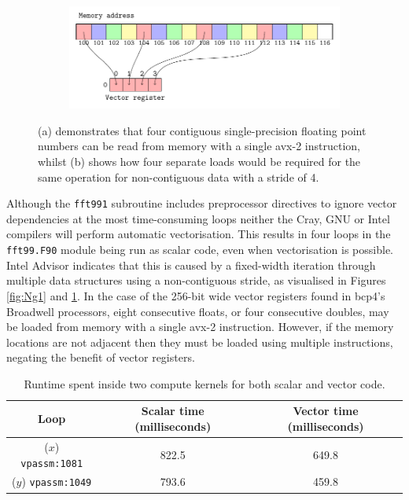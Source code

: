 \documentclass[a4paper,11pt]{report}
\begin{document}
\begin{figure}[htbp]\ContinuedFloat

\begin{subfigure}[b]{1\textwidth}
\centering
   \includegraphics[width=0.80\linewidth]{img/tikz-img/vector_registers_noncontiguous/vector_registers.pdf}
   \caption{}
   \label{fig:Ng2}
\end{subfigure}

\caption[Contiguous and non-contiguous memory access]{ (a) demonstrates that four contiguous single-precision floating point numbers can be read from memory with a single \gls{avx}-2 instruction, whilst (b) shows how four separate loads would be required for the same operation for non-contiguous data with a stride of 4.}
\label{fig:vector-registers} 
\end{figure}
\par
Although the \texttt{fft991} subroutine includes preprocessor directives to ignore vector dependencies at the most time-consuming loops neither the Cray, GNU or Intel compilers will perform automatic vectorisation. This results in four loops in the \texttt{fft99.F90} module being run as scalar code, even when vectorisation is possible. Intel Advisor indicates that this is caused by a fixed-width iteration through multiple data structures using a non-contiguous stride, as visualised in Figures \ref{fig:Ng1} and \ref{fig:Ng2}. In the case of the 256-bit wide vector registers found in \gls{bcp4}'s Broadwell processors, eight consecutive floats, or four consecutive doubles, may be loaded from memory with a single \gls{avx}-2 instruction. However, if the memory locations are not adjacent then they must be loaded using multiple instructions, negating the benefit of vector registers. 
\par
\begin{table}[htp]
\caption{Runtime spent inside two compute kernels for both scalar and vector code.}
\begin{center}
\begin{tabular}{ c c c }
\toprule 		
Loop						&	Scalar time (milliseconds)	&	Vector time (milliseconds)	\\ 
\midrule
($x$) \texttt{vpassm:1081}		&	822.5				&	649.8				\\
($y$) \texttt{vpassm:1049}		&	793.6				&	459.8				\\
\bottomrule
\end{tabular}
\end{center}
\label{tbl:force-vec}
\end{table}
\end{document}
